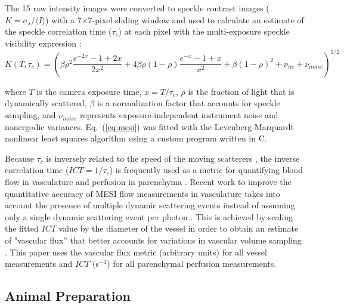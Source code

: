 \documentclass[12pt]{spieman}
\begin{document}
\begin{spacing}{2}
The 15 raw intensity images were converted to speckle contrast images ($K = \sigma_{s} / {\langle{I}\rangle}$) with a 7$\times$7-pixel sliding window and used to calculate an estimate of the speckle correlation time ($\tau_c$) at each pixel with the multi-exposure speckle visibility expression \cite{Parthasarathy:2008el}:
%
\begin{equation}
    \label{eq:mesi}
    K(T,\tau_c) =
        \left(
        \beta\rho^2\frac{e^{-2x} - 1 + 2x}{2x^2} +
        4\beta\rho(1 - \rho)\frac{e^{-x} - 1 + x}{x^2} +
        \beta(1 - \rho)^2 +
        \nu_{ne} +
        \nu_{noise}
        \right)^{1/2}
\end{equation}

\noindent where $T$ is the camera exposure time, $x = T/\tau_c$, $\rho$ is the fraction of light that is dynamically scattered, $\beta$ is a normalization factor that accounts for speckle sampling, and $\nu_{noise}$ represents exposure-independent instrument noise and nonergodic variances. Eq.~(\ref{eq:mesi}) was fitted with the Levenberg-Marquardt nonlinear least squares algorithm \cite{Lourakis:2005} using a custom program written in C.

Because $\tau_c$ is inversely related to the speed of the moving scatterers \cite{Bonner:1981hg,Briers:1996kfa}, the inverse correlation time ($ICT = 1/\tau_c$) is frequently used as a metric for quantifying blood flow in vasculature and perfusion in parenchyma \cite{Ayata:2004ba,Strong:2005kj,Sullender:2018ff}. Recent work to improve the quantitative accuracy of MESI flow measurements in vasculature takes into account the presence of multiple dynamic scattering events instead of assuming only a single dynamic scattering event per photon \cite{Kazmi:2015du}. This is achieved by scaling the fitted $ICT$ value by the diameter of the vessel in order to obtain an estimate of "vascular flux” that better accounts for variations in vascular volume sampling \cite{Kazmi:2015du,Richards:2017df}. This paper uses the vascular flux metric (arbitrary units) for all vessel measurements and $ICT$ (s$^{-1}$) for all parenchymal perfusion measurements.



\subsection{Animal Preparation}


\end{spacing}
\end{document}
